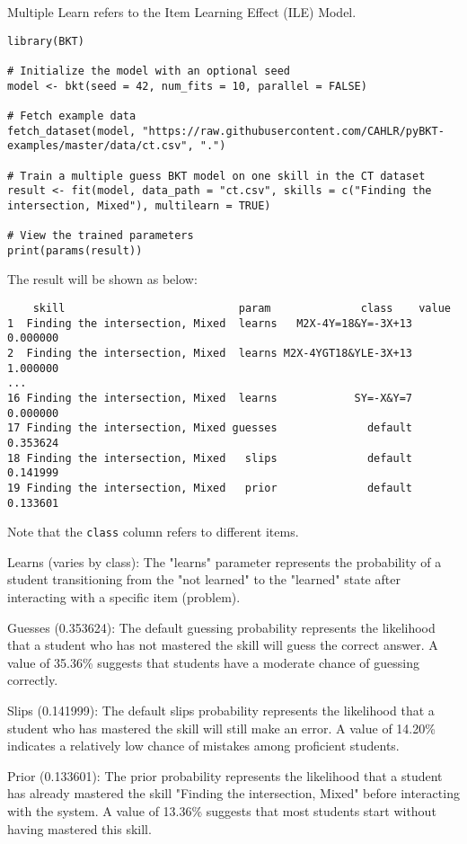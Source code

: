 \documentclass{article}
\begin{document}
Multiple Learn refers to the Item Learning Effect (ILE) Model.

\begin{lstlisting}[caption={R code to train an ILE BKT model}]
library(BKT)

# Initialize the model with an optional seed
model <- bkt(seed = 42, num_fits = 10, parallel = FALSE)

# Fetch example data
fetch_dataset(model, "https://raw.githubusercontent.com/CAHLR/pyBKT-examples/master/data/ct.csv", ".")

# Train a multiple guess BKT model on one skill in the CT dataset
result <- fit(model, data_path = "ct.csv", skills = c("Finding the intersection, Mixed"), multilearn = TRUE)

# View the trained parameters
print(params(result))
\end{lstlisting}

The result will be shown as below:

\begin{verbatim}
    skill                           param              class    value
1  Finding the intersection, Mixed  learns   M2X-4Y=18&Y=-3X+13 0.000000
2  Finding the intersection, Mixed  learns M2X-4YGT18&YLE-3X+13 1.000000
...
16 Finding the intersection, Mixed  learns            SY=-X&Y=7 0.000000
17 Finding the intersection, Mixed guesses              default 0.353624
18 Finding the intersection, Mixed   slips              default 0.141999
19 Finding the intersection, Mixed   prior              default 0.133601
\end{verbatim}
Note that the \texttt{class} column refers to different items.

Learns (varies by class): The "learns" parameter represents the probability of a student transitioning from the "not learned" to the "learned" state after interacting with a specific item (problem).

Guesses (0.353624): The default guessing probability represents the likelihood that a student who has not mastered the skill will guess the correct answer. A value of 35.36\% suggests that students have a moderate chance of guessing correctly.

Slips (0.141999): The default slips probability represents the likelihood that a student who has mastered the skill will still make an error. A value of 14.20\% indicates a relatively low chance of mistakes among proficient students.

Prior (0.133601): The prior probability represents the likelihood that a student has already mastered the skill "Finding the intersection, Mixed" before interacting with the system. A value of 13.36\% suggests that most students start without having mastered this skill.
\end{document}
